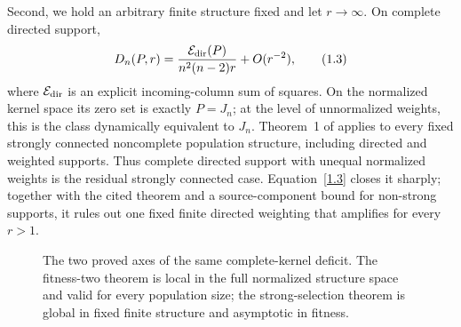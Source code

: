 Second, we hold an arbitrary finite structure fixed and let $r\to\infty$.
On complete directed support,
\[
 D_n(P,r)=\frac{\mathcal E_{\rm dir}(P)}{n^2(n-2)r}+O(r^{-2}),   \tag{1.3}\label{1.3}
\]
where $\mathcal E_{\rm dir}$ is an explicit incoming-column sum of squares.  On
the normalized kernel space its zero set is exactly $P=J_n$; at the level of
unnormalized weights, this is the class dynamically equivalent to $J_n$.
Theorem~1 of \citet{Tkadlec2020} applies to every fixed
strongly connected noncomplete population structure, including directed and
weighted supports.  Thus complete directed support with unequal normalized
weights is the residual strongly connected case.  Equation~\eqref{1.3}
closes it sharply; together with the cited theorem and a source-component
bound for non-strong supports, it rules out one fixed finite directed
weighting that amplifies for every $r>1$.

\begin{figure}[t]
\centering
{}
\caption{The two proved axes of the same complete-kernel deficit.  The
fitness-two theorem is local in the full normalized structure space and valid for every
population size; the strong-selection theorem is global in fixed finite
structure and asymptotic in fitness.}
\label{fig:axes}
\end{figure}

